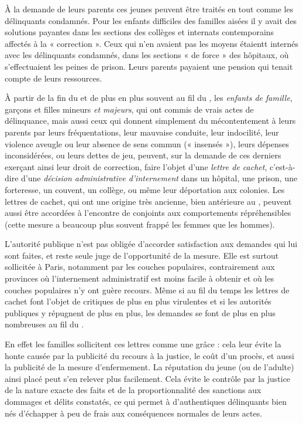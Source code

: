  À la demande de leurs parents ces jeunes peuvent être traités en tout comme les délinquants condamnés. Pour les enfants difficiles des familles aisées il y avait des solutions payantes dans les sections des collèges et internats contemporains affectés à la « correction ». Ceux qui n'en avaient pas les moyens étaientt internés avec les délinquants condamnés, dans les sections « de force » des hôpitaux, où s'effectuaient les peines de prison. Leurs parents payaient une pension qui tenait compte de leurs ressources. 

 À partir de la fin du  et de plus en plus souvent au fil du , les \emph{enfants de famille}, garçons et filles mineurs \emph{et majeurs}, qui ont commis de vrais actes de délinquance, mais aussi ceux qui donnent simplement du mécontentement à leurs parents par leurs fréquentations, leur mauvaise conduite, leur indocilité, leur violence aveugle ou leur absence de sens commun (« insensés »), leurs dépenses inconsidérées, ou leurs dettes de jeu, peuvent, sur la demande de ces derniers exerçant ainsi leur droit de correction, faire l'objet d'une \emph{lettre de cachet}, c'est-à-dire d'une \emph{décision administrative d'internement} dans un hôpital, une prison, une forteresse, un couvent, un collège, ou même leur déportation aux colonies. Les lettres de cachet, qui ont une origine très ancienne, bien antérieure au , peuvent aussi être accordées à l'encontre de conjoints aux comportements répréhensibles (cette mesure a beaucoup plus souvent frappé les femmes que les hommes). 

 L'autorité publique n'est pas obligée d'accorder satisfaction aux demandes qui lui sont faites, et reste seule juge de l'opportunité de la mesure. Elle est surtout sollicitée à Paris, notamment par les couches populaires, contrairement aux provinces où l'internement administratif est moins facile à obtenir et où les couches populaires n'y ont guère recours. Même si au fil du temps les lettres de cachet font l'objet de critiques de plus en plus virulentes et si les autorités publiques y répugnent de plus en plus, les demandes se font de plus en plus nombreuses au fil du . 

 En effet les familles sollicitent ces lettres comme une grâce : cela leur évite la honte causée par la publicité du recours à la justice, le coût d'un procès, et aussi la publicité de la mesure d'enfermement. La réputation du jeune (ou de l'adulte) ainsi placé peut s'en relever plus facilement. Cela évite le contrôle par la justice de la nature exacte des faits et de la proportionnalité des sanctions aux dommages et délits constatés, ce qui permet à d'authentiques délinquants bien nés d'échapper à peu de frais aux conséquences normales de leurs actes. 


